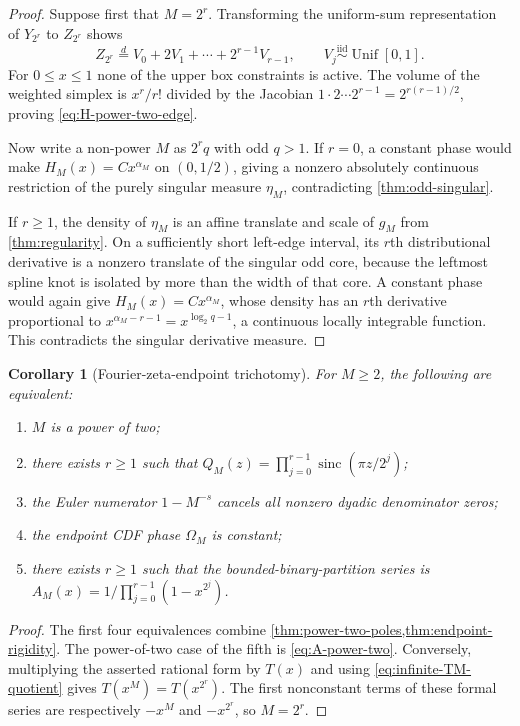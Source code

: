 \documentclass[11pt,oneside]{article}
\newtheorem{corollary}[theorem]{Corollary}
\theoremstyle{definition}
\theoremstyle{remark}
\newcommand{\sinc}{\operatorname{sinc}}
\numberwithin{equation}{section}
\newcommand{\1}{\mathbf 1}
\begin{document}
\begin{proof}
Suppose first that $M=2^r$.  Transforming the uniform-sum representation of $Y_{2^r}$
to $Z_{2^r}$ shows
\begin{equation}
 Z_{2^r}\overset d=V_0+2V_1+\cdots+2^{r-1}V_{r-1},
 \qquad V_j\overset{\mathrm{iid}}\sim\operatorname{Unif}[0,1].
 \label{eq:Z-power-two-uniforms}
\end{equation}
For $0\le x\le1$ none of the upper box constraints is active.  The volume of the weighted
simplex is $x^r/r!$ divided by the Jacobian
$1\cdot2\cdots2^{r-1}=2^{r(r-1)/2}$, proving \eqref{eq:H-power-two-edge}.

Now write a non-power $M$ as $2^rq$ with odd $q>1$.  If $r=0$, a constant phase would
make $H_M(x)=Cx^{\alpha_M}$ on $(0,1/2)$, giving a nonzero absolutely continuous
restriction of the purely singular measure $\eta_M$, contradicting
\cref{thm:odd-singular}.

If $r\ge1$, the density of $\eta_M$ is an affine translate and scale of $g_M$ from
\cref{thm:regularity}.  On a sufficiently short left-edge interval, its $r$th
distributional derivative is a nonzero translate of the singular odd core, because the
leftmost spline knot is isolated by more than the width of that core.  A constant phase
would again give $H_M(x)=Cx^{\alpha_M}$, whose density has an $r$th derivative
proportional to
$x^{\alpha_M-r-1}=x^{\log_2q-1}$, a continuous locally integrable function.  This
contradicts the singular derivative measure.
\end{proof}

\begin{corollary}[Fourier-zeta-endpoint trichotomy]
\label{cor:rigidity-equivalences}
For $M\ge2$, the following are equivalent:
\begin{enumerate}
\item $M$ is a power of two;
\item there exists $r\ge1$ such that
$Q_M(z)=\prod_{j=0}^{r-1}\sinc(\pi z/2^j)$;
\item the Euler numerator $1-M^{-s}$ cancels all nonzero dyadic denominator zeros;
\item the endpoint CDF phase $\Omega_M$ is constant;
\item there exists $r\ge1$ such that the bounded-binary-partition series is
$A_M(x)=1/\prod_{j=0}^{r-1}(1-x^{2^j})$.
\end{enumerate}
\end{corollary}

\begin{proof}
The first four equivalences combine \cref{thm:power-two-poles,thm:endpoint-rigidity}.
The power-of-two case of the fifth is \eqref{eq:A-power-two}.  Conversely, multiplying the
asserted rational form by $T(x)$ and using \eqref{eq:infinite-TM-quotient} gives
$T(x^M)=T(x^{2^r})$.  The first nonconstant terms of these formal series are respectively
$-x^M$ and $-x^{2^r}$, so $M=2^r$.
\end{proof}
\end{document}
